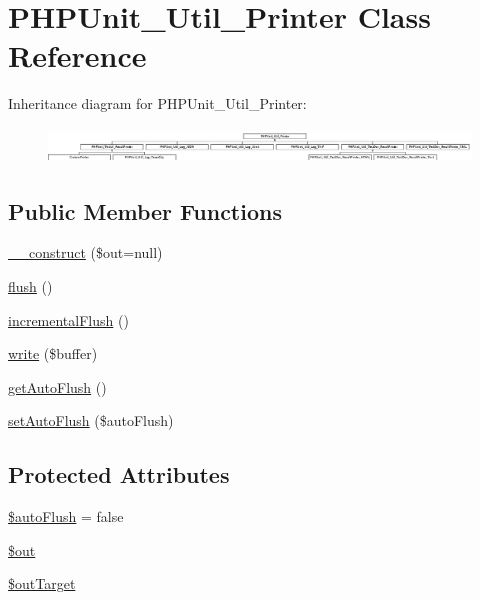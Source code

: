 \hypertarget{class_p_h_p_unit___util___printer}{}\section{P\+H\+P\+Unit\+\_\+\+Util\+\_\+\+Printer Class Reference}
\label{class_p_h_p_unit___util___printer}
Inheritance diagram for P\+H\+P\+Unit\+\_\+\+Util\+\_\+\+Printer\+:\begin{figure}[H]
\begin{center}
\leavevmode
\includegraphics[height=0.916031cm]{class_p_h_p_unit___util___printer}
\end{center}
\end{figure}
\subsection*{Public Member Functions}
\begin{DoxyCompactItemize}
\item 
\mbox{\hyperlink{class_p_h_p_unit___util___printer_a058d0261b18ee18c9fad1ffb1d08775c}{\+\_\+\+\_\+construct}} (\$out=null)
\item 
\mbox{\hyperlink{class_p_h_p_unit___util___printer_a7751f77b5263bcf940ece6e824a05b38}{flush}} ()
\item 
\mbox{\hyperlink{class_p_h_p_unit___util___printer_acf90e383b291bfaaccee1014f70fe3dc}{incremental\+Flush}} ()
\item 
\mbox{\hyperlink{class_p_h_p_unit___util___printer_ab3c1b3a323cbbf707c55cc3cd3efd811}{write}} (\$buffer)
\item 
\mbox{\hyperlink{class_p_h_p_unit___util___printer_a7f7730a383eca33e065cd8e709f5de12}{get\+Auto\+Flush}} ()
\item 
\mbox{\hyperlink{class_p_h_p_unit___util___printer_a5513242b573a539641e99f27182b7623}{set\+Auto\+Flush}} (\$auto\+Flush)
\end{DoxyCompactItemize}
\subsection*{Protected Attributes}
\begin{DoxyCompactItemize}
\item 
\mbox{\hyperlink{class_p_h_p_unit___util___printer_aef8c7c76f1d8d3bce4c43e7e6d736f3a}{\$auto\+Flush}} = false
\item 
\mbox{\hyperlink{class_p_h_p_unit___util___printer_a48cb304902320d173a4eaa41543327b9}{\$out}}
\item 
\mbox{\hyperlink{class_p_h_p_unit___util___printer_a4b838464425ac549611cb6b833f65793}{\$out\+Target}}
\end{DoxyCompactItemize}



